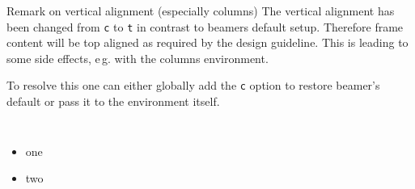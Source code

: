 \documentclass[
    english,
    accentcolor=9c,
    design=2023,
    logofile=hulogo.pdf,
]{tudabeamer}
\newcommand*{\code}[1]{\texttt{#1}}
\begin{document}
\begin{frame}{Remark on vertical alignment (especially columns)}
    The vertical alignment has been changed from \code{c} to \code{t} in contrast to beamers default setup.
    Therefore frame content will be top aligned as required by the design guideline.
    This is leading to some side effects,  e\,g. with the columns environment.

    To resolve this one can either globally add the \code{c} option to restore beamer's default or pass it to the environment itself.

    \begin{columns}[onlytextwidth,c]
        \begin{itemize}
            \item one
            \item two
        \end{itemize}
    \end{columns}
\end{frame}
\end{document}
